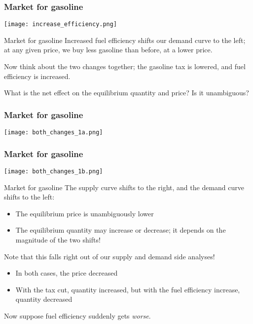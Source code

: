 \documentclass[aspectratio=169]{beamer}
\begin{document}
\begin{frame}
    \frametitle{Market for gasoline}
    \centering
    \texttt{[image: increase\_efficiency.png]}
\end{frame}

\begin{frame}{Market for gasoline}
    Increased fuel efficiency shifts our demand curve to the left; at any given price, we buy less gasoline than before, at a lower price.

    \medskip

    Now think about the two changes together; the gasoline tax is lowered, and fuel efficiency is increased. 
    
    \medskip

    What is the net effect on the equilibrium quantity and price? Is it unambiguous?
\end{frame}

\begin{frame}
    \frametitle{Market for gasoline}
    \centering
    \texttt{[image: both\_changes\_1a.png]}
\end{frame}

\begin{frame}
    \frametitle{Market for gasoline}
    \centering
    \texttt{[image: both\_changes\_1b.png]}
\end{frame}

\begin{frame}{Market for gasoline}
    The supply curve shifts to the right, and the demand curve shifts to the left:
    \begin{itemize}
        \item The equilibrium price is unambiguously lower
        \item The equilibrium quantity may increase or decrease; it depends on the magnitude of the two shifts!
    \end{itemize}

    Note that this falls right out of our supply and demand side analyses!
    \begin{itemize}
        \item In both cases, the price decreased
        \item With the tax cut, quantity increased, but with the fuel efficiency increase, quantity decreased
    \end{itemize}

    Now suppose fuel efficiency suddenly gets \textit{worse}.

\end{frame}
\end{document}
